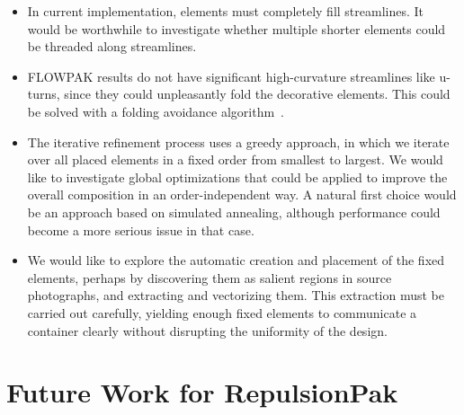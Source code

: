 \begin{itemize}

\item In current implementation, elements must completely fill streamlines.
It would be worthwhile to investigate whether multiple shorter elements
could be threaded along streamlines.

\item FLOWPAK results do not have significant high-curvature streamlines like u-turns, 
since they could unpleasantly fold the decorative elements. This could be solved with a folding avoidance algorithm~\cite{Asente2010}.

\item The iterative refinement process uses a greedy approach, in which we 
iterate over all placed elements in a fixed order from smallest to largest.
We would like to investigate global optimizations
that could be applied to improve the overall composition in an 
order-independent way.  A natural first choice would be an approach based
on simulated annealing, although performance could become a more serious
issue in that case.

\item We would like to explore the automatic creation and placement of 
the fixed elements, perhaps by discovering them as salient regions 
in source photographs, and extracting and vectorizing them.  This 
extraction must be carried out carefully, yielding enough fixed elements
to communicate a container clearly without disrupting the uniformity of
the design.

\end{itemize}

\section{Future Work for RepulsionPak}


